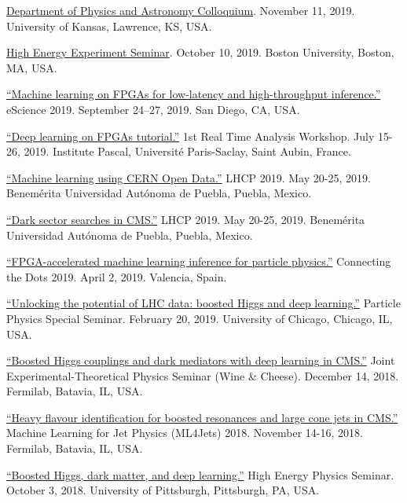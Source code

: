 \documentclass[11pt]{res}
\begin{document}
\begin{resume}
\href{https://physics.drupal.ku.edu/calendar/colloquia#/?i=2}{Department of Physics and Astronomy Colloquium}. November 11, 2019. University of Kansas, Lawrence, KS, USA.

\href{http://physics.bu.edu/events/show/2204}{High Energy Experiment Seminar}. October 10, 2019. Boston University, Boston, MA, USA.

\href{https://escience2019.sdsc.edu/program}{``Machine
  learning on FPGAs for low-latency and high-throughput inference.''}
eScience 2019. September 24–27, 2019. San Diego, CA, USA.

\href{https://indico.cern.ch/event/793125/contributions/3495251/}{``Deep learning on FPGAs tutorial.''} 1st Real Time Analysis Workshop. July 15-26, 2019. Institute Pascal, Universit\'{e} Paris-Saclay, Saint Aubin, France.

\href{https://indico.cern.ch/event/687651/contributions/3428206/}{``Machine
  learning using CERN Open Data.''} LHCP 2019. May
  20-25, 2019. Benem\'{e}rita Universidad Aut\'{o}noma de Puebla, Puebla, Mexico.

\href{https://indico.cern.ch/event/687651/contributions/3426898/}{``Dark
  sector searches in CMS.''} LHCP 2019. May
  20-25, 2019. Benem\'{e}rita Universidad Aut\'{o}noma de Puebla, Puebla, Mexico.

\href{https://indico.cern.ch/event/742793/contributions/3274392/}{``FPGA-accelerated
  machine learning inference for particle physics.''} Connecting the
Dots 2019. April 2, 2019. Valencia, Spain.

\href{https://universityofchicago.hosted.panopto.com/Panopto/Pages/Viewer.aspx?id=66ca09d7-74c1-4b12-bb57-a9fa01046cdf}{``Unlocking
  the potential of LHC data: boosted Higgs and deep learning.''}
Particle Physics Special Seminar. February 20, 2019. University of Chicago, Chicago, IL, USA.

\href{http://theory.fnal.gov/events/event/results-from-cms-18/}{``Boosted
  Higgs couplings and dark mediators with deep learning in CMS.''}
Joint Experimental-Theoretical Physics Seminar (Wine \& Cheese). December 14, 2018. Fermilab, Batavia, IL, USA.

\href{https://indico.cern.ch/event/745718/contributions/3211982/}{``Heavy
  flavour identification for boosted resonances and large cone jets in
  CMS.''} Machine Learning for Jet Physics (ML4Jets) 2018. November
14-16, 2018. Fermilab, Batavia, IL, USA.

\href{https://www.physicsandastronomy.pitt.edu/events/hep-seminar-javier-duarte-fermilab}{``Boosted
    Higgs, dark matter, and deep learning.''} High Energy Physics
  Seminar. October 3, 2018. University of Pittsburgh, Pittsburgh, PA, USA.


\end{resume}
\end{document}
